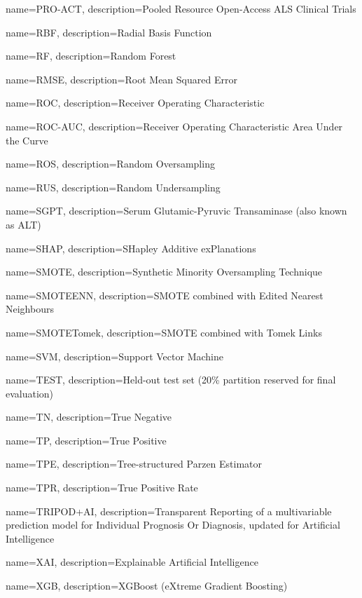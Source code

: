 {
	name=PRO-ACT,
	description={Pooled Resource Open-Access ALS Clinical Trials}
}

{
	name=RBF,
	description={Radial Basis Function}
}

{
	name=RF,
	description={Random Forest}
}

{
	name=RMSE,
	description={Root Mean Squared Error}
}

{
	name=ROC,
	description={Receiver Operating Characteristic}
}

{
	name=ROC-AUC,
	description={Receiver Operating Characteristic Area Under the Curve}
}

{
	name=ROS,
	description={Random Oversampling}
}

{
	name=RUS,
	description={Random Undersampling}
}

{
	name=SGPT,
	description={Serum Glutamic-Pyruvic Transaminase (also known as ALT)}
}

{
	name=SHAP,
	description={SHapley Additive exPlanations}
}

{
	name=SMOTE,
	description={Synthetic Minority Oversampling Technique}
}

{
	name=SMOTEENN,
	description={SMOTE combined with Edited Nearest Neighbours}
}

{
	name=SMOTETomek,
	description={SMOTE combined with Tomek Links}
}

{
	name=SVM,
	description={Support Vector Machine}
}

{
	name=TEST,
	description={Held-out test set (20\% partition reserved for final evaluation)}
}

{
	name=TN,
	description={True Negative}
}

{
	name=TP,
	description={True Positive}
}

{
	name=TPE,
	description={Tree-structured Parzen Estimator}
}

{
	name=TPR,
	description={True Positive Rate}
}

{
    name={TRIPOD+AI},
    description={Transparent Reporting of a multivariable prediction model for Individual Prognosis Or Diagnosis, updated for Artificial Intelligence}
}

{
	name=XAI,
	description={Explainable Artificial Intelligence}
}

{
	name=XGB,
	description={XGBoost (eXtreme Gradient Boosting)}
}

































